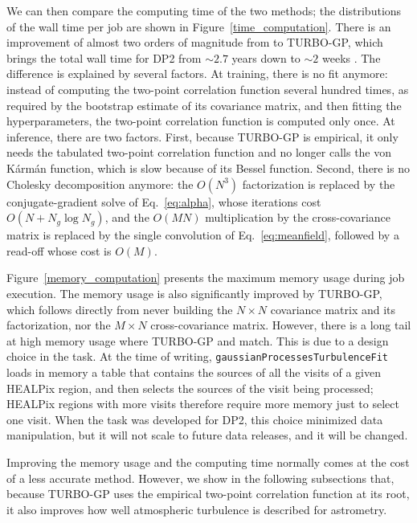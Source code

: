 We can then compare the computing time of the two methods; the distributions of the wall time per job are shown in Figure~\ref{time_computation}.
There is an improvement of almost two orders of magnitude from  to TURBO-GP, which brings the total
wall time for DP2 from ${\sim}2.7$ years down to ${\sim}2$ weeks .
The difference is explained by several factors.
At training, there is no fit anymore: instead of computing the two-point correlation function several hundred times, as required by 
the bootstrap estimate of its covariance matrix, and then fitting the hyperparameters, the two-point correlation function is computed only once.
At inference, there are two factors.
First, because TURBO-GP is empirical, it only needs the tabulated two-point correlation function and no longer calls the 
von K\'arm\'an function, which is slow because of its Bessel function.
Second, there is no Cholesky decomposition anymore: the $O(N^3)$ factorization is replaced by the conjugate-gradient solve
of Eq.~\ref{eq:alpha}, whose iterations cost $O(N + N_g \log N_g)$, and the $O(MN)$ multiplication by the cross-covariance 
matrix is replaced by the single convolution of Eq.~\ref{eq:meanfield}, followed by a read-off whose cost is $O(M)$.

Figure~\ref{memory_computation} presents the maximum memory usage during job execution.
The memory usage is also significantly improved by TURBO-GP, which follows directly from never building the $N \times N$ covariance matrix 
and its factorization, nor the $M \times N$ cross-covariance matrix.
However, there is a long tail at high memory usage where TURBO-GP and  match.
This is due to a design choice in the task.
At the time of writing, \texttt{gaussianProcessesTurbulenceFit} loads in memory a table that contains the sources of all the visits of a 
given HEALPix region, and then selects the sources of the visit being processed; HEALPix regions with more visits therefore require 
more memory just to select one visit.
When the task was developed for DP2, this choice minimized data manipulation, but it will not scale to future data releases, and it will be changed.

Improving the memory usage and the computing time normally comes at the cost of a less accurate method.
However, we show in the following subsections that, because TURBO-GP uses the empirical two-point correlation function at its root, 
it also improves how well atmospheric turbulence is described for astrometry.


